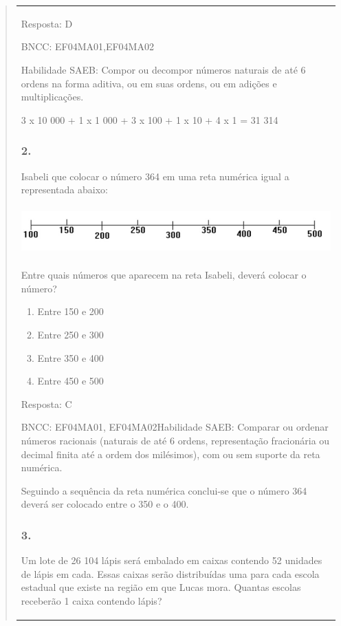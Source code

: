 \begin{enumerate}
\begin{escolha}
\begin{enumerate}
\begin{itemize}
\begin{itemize}
\begin{escolha}
\begin{quote}
\begin{escolha}
{\begin{longtable}[]{@{}l@{}}
\begin{itemize}
Resposta: D

BNCC: EF04MA01,EF04MA02

Habilidade SAEB: Compor ou decompor números naturais de até 6 ordens na
forma aditiva, ou em suas ordens, ou em adições e multiplicações.

3 x 10 000 + 1 x 1 000 + 3 x 100 + 1 x 10 + 4 x 1 = 31 314

\subsubsection{2.}\label{section-158}

Isabeli que colocar o número 364 em uma reta numérica igual a
representada abaixo:

\includegraphics[width=5.90556in,height=0.74931in]{media/image153.png}

Entre quais números que aparecem na reta Isabeli, deverá colocar o
número?

\begin{enumerate}
\def\labelenumi{\alph{enumi})}
\item
  Entre 150 e 200
\item
  Entre 250 e 300
\item
  Entre 350 e 400
\item
  Entre 450 e 500
\end{enumerate}

Resposta: C

BNCC: EF04MA01, EF04MA02Habilidade SAEB: Comparar ou ordenar números
racionais (naturais de até 6 ordens, representação fracionária ou
decimal finita até a ordem dos milésimos), com ou sem suporte da reta
numérica.

Seguindo a sequência da reta numérica conclui-se que o número 364 deverá
ser colocado entre o 350 e o 400.

\subsubsection{3.}\label{section-159}

Um lote de 26 104 lápis será embalado em caixas contendo 52 unidades de
lápis em cada. Essas caixas serão distribuídas uma para cada escola
estadual que existe na região em que Lucas mora. Quantas escolas
receberão 1 caixa contendo lápis?


\end{itemize}
\end{longtable}}
\end{escolha}
\end{quote}
\end{escolha}
\end{itemize}
\end{itemize}
\end{enumerate}
\end{escolha}
\end{enumerate}
